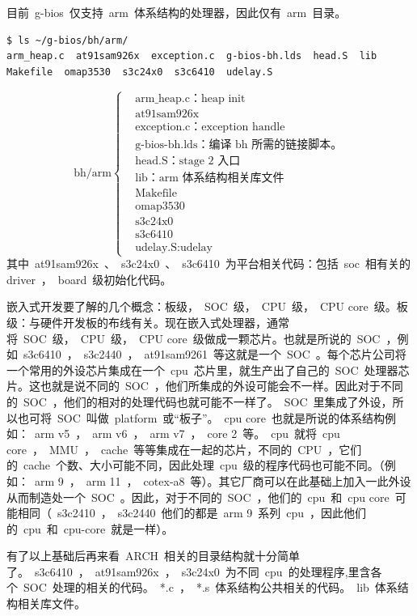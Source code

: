 \documentclass[a4paper,11pt]{book}
\begin{document}
目前~g-bios~仅支持~arm~体系结构的处理器，因此仅有~arm~目录。
\begin{lstlisting}[language={SH},numbers=none]
$ ls ~/g-bios/bh/arm/
arm_heap.c  at91sam926x  exception.c  g-bios-bh.lds  head.S  lib  Makefile  omap3530  s3c24x0  s3c6410  udelay.S
\end{lstlisting}

\begin{equation*}
\text{bh/arm}
\left\{
	\begin{aligned}
	&\text{arm\_heap.c：heap init} \\
	&\text{at91sam926x} \\
	&\text{exception.c：exception handle} \\
	&\text{g-bios-bh.lds：编译~bh~所需的链接脚本。} \\
	&\text{head.S：stage 2~入口} \\
	&\text{lib：arm~体系结构相关库文件} \\
	&\text{Makefile}\\
	&\text{omap3530}\\
	&\text{s3c24x0}\\
	&\text{s3c6410}\\
	&\text{udelay.S:udelay}
	\end{aligned}
\right.
\end{equation*}
其中~at91sam926x~、~s3c24x0~、~s3c6410~为平台相关代码：包括~soc~相有关的driver~，~board~级初始化代码。

嵌入式开发要了解的几个概念：板级，~SOC~级，~CPU~级，~CPU core~级。板级：与硬件开发板的布线有关。现在嵌入式处理器，通常将~SOC~级，~CPU~级，~CPU core~级做成一颗芯片。也就是所说的~SOC~，例如~s3c6410~，~s3c2440~，~at91sam9261~等这就是一个~SOC~。每个芯片公司将一个常用的外设芯片集成在一个~cpu~芯片里，就生产出了自己的~SOC~处理器芯片。这也就是说不同的~SOC~，他们所集成的外设可能会不一样。因此对于不同的~SOC~，他们的相对的处理代码也就可能不一样了。~SOC~里集成了外设，所以也可将~SOC~叫做~platform~或``板子''。~cpu core~也就是所说的体系结构例如：~arm v5~，~arm v6~，~arm v7~，~core 2~等。~cpu~就将~cpu core~，~MMU~，~cache~等等集成在一起的芯片，不同的~CPU~，它们的~cache~个数、大小可能不同，因此处理~cpu~级的程序代码也可能不同。（例如：~arm 9~，~arm 11~，~cotex-a8~等）。其它厂商可以在此基础上加入一此外设从而制造处一个~SOC~。因此，对于不同的~SOC~，他们的~cpu~和~cpu core~可能相同（~s3c2410~，~s3c2440~他们的都是~arm 9~系列~cpu~，因此他们的~cpu~和~cpu-core~就是一样）。

有了以上基础后再来看~ARCH~相关的目录结构就十分简单了。~s3c6410~，~at91sam926x~，~s3c24x0~为不同~cpu~的处理程序,里含各个~SOC~处理的相关的代码。~*.c~，~*.s~体系结构公共相关的代码。~lib~体系结构相关库文件。
\end{document}
